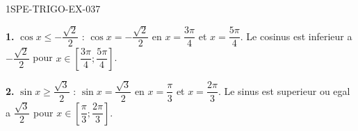 \begin{corrige}{1SPE-TRIGO-EX-037}

\textbf{1.} $\cos x \leqslant -\dfrac{\sqrt{2}}{2}$ : $\cos x = -\dfrac{\sqrt{2}}{2}$ en $x = \dfrac{3\pi}{4}$ et $x = \dfrac{5\pi}{4}$. Le cosinus est inferieur a $-\dfrac{\sqrt{2}}{2}$ pour $x \in \left[\dfrac{3\pi}{4};\dfrac{5\pi}{4}\right]$.

\textbf{2.} $\sin x \geqslant \dfrac{\sqrt{3}}{2}$ : $\sin x = \dfrac{\sqrt{3}}{2}$ en $x = \dfrac{\pi}{3}$ et $x = \dfrac{2\pi}{3}$. Le sinus est superieur ou egal a $\dfrac{\sqrt{3}}{2}$ pour $x \in \left[\dfrac{\pi}{3};\dfrac{2\pi}{3}\right]$.

\end{corrige}
